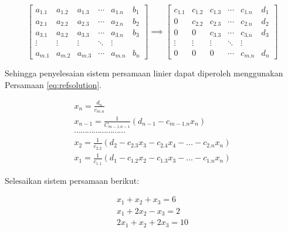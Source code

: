 \documentclass[]{book}
\theoremstyle{definition}
\theoremstyle{definition}
\theoremstyle{definition}
\theoremstyle{remark}
\let\BeginKnitrBlock\begin \let\EndKnitrBlock\end
\begin{document}
\begin{equation}
\begin{bmatrix}
     a_{1.1} & a_{1.2} & a_{1.3} &\cdots& a_{1.n} & b_1     \\[0.3em]
     a_{2.1} & a_{2.2} & a_{2.3} &\cdots& a_{2.n} & b_2     \\[0.3em]
     a_{3.1} & a_{3.2} & a_{3.3} &\cdots& a_{3.n} & b_3     \\[0.3em]
     \vdots  & \vdots  & \vdots &\ddots& \vdots             \\[0.3em]
     a_{m.1} & a_{m.2} & a_{m.3} &\cdots& a_{m.n} & b_n
     \end{bmatrix}
\implies
\begin{bmatrix}
     c_{1.1} & c_{1.2} & c_{1.3} &\cdots& c_{1.n} & d_1     \\[0.3em]
     0       & c_{2.2} & c_{2.3} &\cdots& c_{2.n} & d_2     \\[0.3em]
     0       & 0       & c_{3.3} &\cdots& c_{3.n} & d_3     \\[0.3em]
     \vdots  & \vdots  & \vdots &\ddots& \vdots             \\[0.3em]
     0       & 0       & 0      &\cdots& c_{m.n} & d_n
     \end{bmatrix}
  \label{eq:refeq}
\end{equation}

Sehingga penyelesaian sistem persamaan linier dapat diperoleh menggunakan Persamaan \eqref{eq:refsolution}.

\begin{equation}
\begin{matrix}
  x_n=\frac{d_n}{c_{m.n}} \\
  x_{n-1}=\frac{1}{C_{m-1.n-1}}\left(d_{n-1}-c_{m-1.n}x_n\right) \\
  \cdots\cdots\cdots\cdots\cdots\cdots\cdots\cdots       \\
  x_2=\frac{1}{c_{2.2}}\left(d_2-c_{2.3}x_3-c_{2.4}x_4-\dots-c_{2.n}x_n\right) \\
  x_1=\frac{1}{c_{1.1}}\left(d_1-c_{1.2}x_2-c_{1.3}x_3-\dots-c_{1.n}x_n\right)
   \end{matrix}
  \label{eq:refsolution}
\end{equation}

\BeginKnitrBlock{example}
\protect\hypertarget{exm:refexm}{}{\label{exm:refexm} }Selesaikan sistem persamaan berikut:
\EndKnitrBlock{example}

\[
\begin{matrix}
  x_1+x_2+x_3=6 \\
  x_1+2x_2-x_3=2 \\
  2x_1+x_2+2x_3=10 \\
\end{matrix}
\]
\end{document}
